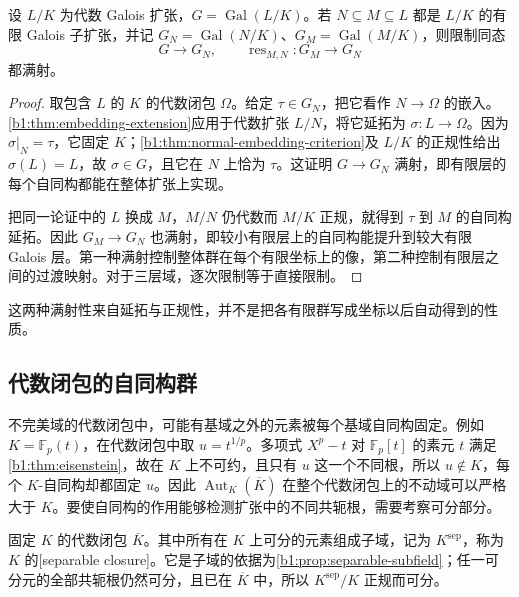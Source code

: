 \begin{lemma}\label{b1:lem:galois-restriction-surjective}
	设 \(L/K\) 为代数 Galois 扩张，\(G=\operatorname{Gal}(L/K)\)。若 \(N\subseteq M\subseteq L\) 都是 \(L/K\) 的有限 Galois 子扩张，并记 \(G_N=\operatorname{Gal}(N/K)\)、\(G_M=\operatorname{Gal}(M/K)\)，则限制同态
	\[
		G\longrightarrow G_N, \qquad \operatorname{res}_{M,N}:G_M\longrightarrow G_N
	\]
	都满射。
\end{lemma}
\begin{proof}
	取包含 \(L\) 的 \(K\) 的代数闭包 \(\Omega\)。给定 \(\tau\in G_N\)，把它看作 \(N\rightarrow\Omega\) 的嵌入。\cref{b1:thm:embedding-extension}应用于代数扩张 \(L/N\)，将它延拓为 \(\sigma:L\rightarrow\Omega\)。因为 \(\sigma|_N=\tau\)，它固定 \(K\)；\cref{b1:thm:normal-embedding-criterion}及 \(L/K\) 的正规性给出 \(\sigma(L)=L\)，故 \(\sigma\in G\)，且它在 \(N\) 上恰为 \(\tau\)。这证明 \(G\rightarrow G_N\) 满射，即有限层的每个自同构都能在整体扩张上实现。

	把同一论证中的 \(L\) 换成 \(M\)，\(M/N\) 仍代数而 \(M/K\) 正规，就得到 \(\tau\) 到 \(M\) 的自同构延拓。因此 \(G_M\rightarrow G_N\) 也满射，即较小有限层上的自同构能提升到较大有限 Galois 层。第一种满射控制整体群在每个有限坐标上的像，第二种控制有限层之间的过渡映射。对于三层域，逐次限制等于直接限制。
\end{proof}
这两种满射性来自延拓与正规性，并不是把各有限群写成坐标以后自动得到的性质。

\subsection{代数闭包的自同构群}
\label{b1:subsec:2201:02}
不完美域的代数闭包中，可能有基域之外的元素被每个基域自同构固定。例如 \(K=\mathbb F_p(t)\)，在代数闭包中取 \(u=t^{1/p}\)。多项式 \(X^p-t\) 对 \(\mathbb F_p[t]\) 的素元 \(t\) 满足\cref{b1:thm:eisenstein}，故在 \(K\) 上不可约，且只有 \(u\) 这一个不同根，所以 \(u\notin K\)，每个 \(K\)-自同构却都固定 \(u\)。因此 \(\operatorname{Aut}_K(\overline K)\) 在整个代数闭包上的不动域可以严格大于 \(K\)。要使自同构的作用能够检测扩张中的不同共轭根，需要考察可分部分。

\ProseParagraphBreak
固定 \(K\) 的代数闭包 \(\overline K\)。其中所有在 \(K\) 上可分的元素组成子域，记为 \(K^{\mathrm{sep}}\)，称为 \(K\) 的[separable closure]。它是子域的依据为\cref{b1:prop:separable-subfield}；任一可分元的全部共轭根仍然可分，且已在 \(\overline K\) 中，所以 \(K^{\mathrm{sep}}/K\) 正规而可分。

